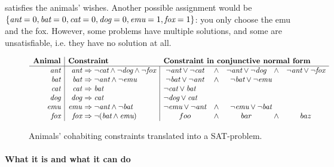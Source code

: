 \noindent satisfies the animals' wishes.
Another possible assignment would be $\{\text{\em ant}=0, \text{\em bat}=0, \text{\em cat}=0, \text{\em dog}=0, \text{\em emu}=1, \text{\em fox}=1\}$: you only choose the emu and the fox. 
 However, some problems have multiple solutions, and some are unsatisfiable, i.e. they have no solution at all.

 \begin{figure}[t]
  $$\begin{array}{r | r @{~} l | c @{\quad \wedge \quad } c @{\quad \wedge \quad} c }
   \textbf{Animal}
                & \multicolumn{2}{l}{\textbf{Constraint}} 
                                        & \multicolumn{3}{l}{\textbf{Constraint in conjunctive normal form}} \\ \hline

    \ant        & \ant &\Rightarrow \neg{}\cat \wedge \neg{}\dog \wedge \neg{}\fox 
    								    & \neg{}\ant \vee \neg{}\cat 
                                        & \neg{}\ant \vee \neg{}\dog 
                                        & \neg{}\ant \vee \neg{}\fox \\

   \bat         & \bat &\Rightarrow \neg{}\ant \wedge \neg{}\emu
   								        & \neg{}\bat \vee \neg{}\ant 
                                        & \multicolumn{2}{l}{\neg{}\bat \vee \neg{}\emu} \\
   \cat         & \cat &\Rightarrow \bat & \multicolumn{3}{l}{\neg{}\cat \vee \bat} \\
   \dog         & \dog &\Rightarrow \cat & \multicolumn{3}{l}{\neg{}\dog \vee \cat} \\
   \emu         & \emu &\Rightarrow \neg{}\ant \wedge \neg{}\bat
   										& \neg{}\emu \vee \neg{}\ant 
                                        & \multicolumn{2}{l}{\neg{}\emu \vee \neg{}\bat} \\
   \fox         & \fox &\Rightarrow \neg (\bat \wedge \emu) 
   									    & foo 
   									    & bar
   									    & baz \\

  \end{array}$$
  \caption{Animals' cohabiting constraints translated into a SAT-problem.}

\end{figure}



\paragraph{What it is and what it can do}


